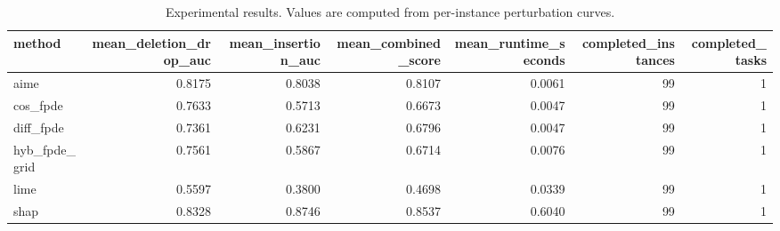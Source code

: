 \begin{table}[t]
\caption{Experimental results. Values are computed from per-instance perturbation curves.}
\label{tab:main_results_computed}
\centering
\begin{tabular}{lrrrrrr}
\toprule
method & mean\_deletion\_drop\_auc & mean\_insertion\_auc & mean\_combined\_score & mean\_runtime\_seconds & completed\_instances & completed\_tasks \\
\midrule
aime & 0.8175 & 0.8038 & 0.8107 & 0.0061 & 99 & 1 \\
cos\_fpde & 0.7633 & 0.5713 & 0.6673 & 0.0047 & 99 & 1 \\
diff\_fpde & 0.7361 & 0.6231 & 0.6796 & 0.0047 & 99 & 1 \\
hyb\_fpde\_grid & 0.7561 & 0.5867 & 0.6714 & 0.0076 & 99 & 1 \\
lime & 0.5597 & 0.3800 & 0.4698 & 0.0339 & 99 & 1 \\
shap & 0.8328 & 0.8746 & 0.8537 & 0.6040 & 99 & 1 \\
\bottomrule
\end{tabular}

\end{table}
